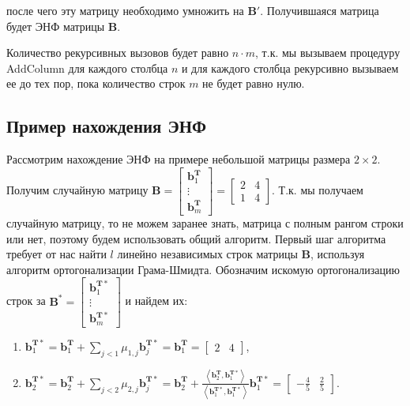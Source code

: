 после чего эту матрицу необходимо умножить на $ \mathbf{B}' $. Получившаяся матрица будет ЭНФ матрицы $ \mathbf{B} $.

Количество рекурсивных вызовов будет равно $ n \cdot m $, т.к. мы вызываем процедуру AddColumn для каждого столбца $ n $ и для каждого столбца рекурсивно вызываем ее до тех пор, пока количество строк $ m $ не будет равно нулю.

\subsection{Пример нахождения ЭНФ}

Рассмотрим нахождение ЭНФ на примере небольшой матрицы размера $ 2 \times 2 $. Получим случайную матрицу $ \mathbf{B} =
\left[ \begin{array}{cccc}
\mathbf{b}^{\mathbf{T}}_1 \\
\vdots \\
\mathbf{b}^{\mathbf{T}}_m
\end{array} \right]
=
\left[ \begin{array}{cccc}
2 & 4 \\
1 & 4
\end{array} \right] $. Т.к. мы получаем случайную матрицу, то не можем заранее знать, матрица с полным рангом строки или нет, поэтому будем использовать общий алгоритм. Первый шаг алгоритма требует от нас найти $ l $ линейно независимых строк матрицы $ \mathbf{B} $, используя алгоритм ортогонализации Грама-Шмидта. Обозначим искомую ортогонализацию строк за $ \mathbf{B}^* = \left[ \begin{array}{cccc}
\mathbf{b}^{\mathbf{T}*}_1 \\
\vdots \\
\mathbf{b}^{\mathbf{T}*}_m
\end{array} \right] $ и найдем их:

\begin{enumerate}

\item $ \mathbf{b}^{\mathbf{T}*}_1 = \mathbf{b}^{\mathbf{T}}_1 + \sum\limits_{j < 1} \mu_{1, j}\mathbf{b}^{\mathbf{T}*}_j = \mathbf{b}^{\mathbf{T}}_1 = \left[ \begin{array}{cccc}
2 & 4
\end{array}
\right]$,

\item $ \mathbf{b}^{\mathbf{T}*}_2 = \mathbf{b}^{\mathbf{T}}_2 + \sum\limits_{j < 2} \mu_{2, j}\mathbf{b}^{\mathbf{T}*}_j = \mathbf{b}^{\mathbf{T}}_2 + \frac{\left\langle \mathbf{b}^{\mathbf{T}}_2, \mathbf{b}^{\mathbf{T}*}_1 \right\rangle}{\left\langle \mathbf{b}^{\mathbf{T}*}_1, \mathbf{b}^{\mathbf{T}*}_1 \right\rangle} \mathbf{b}^{\mathbf{T}*}_1 = \left[ \begin{array}{cccc}
-\frac{4}{5} & \frac{2}{5}
\end{array}
\right]$.

\end{enumerate}

